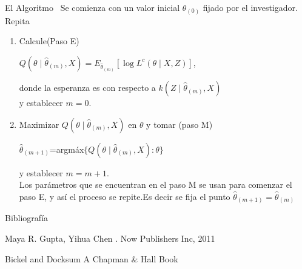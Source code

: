 \documentclass[utf8,spanish,xcolor={table,dvipsnames},12pt]{beamer}
\begin{document}
\begin{frame}{El Algoritmo}
\pause\
Se comienza con un valor inicial $\hat{\theta}_{(0)}$ fijado por el investigador.\\
Repita
\pause\
\begin{enumerate}
  \item Calcule(Paso E)
        \begin{center}
          $Q(\theta\mid\hat{\theta}_{(m)},X)=E_{\hat{\theta}_{(m)}}[\log L^{c}(\theta\mid X,Z)]$,
         \end{center}
        donde la esperanza es con respecto a $k(Z\mid\hat{\theta}_{(m)},X)$ \\
        y establecer $m=0$.
   \pause\ 
  \item Maximizar $Q(\theta\mid\hat{\theta}_{(m)},X)$ en $\theta$ y tomar (paso M)
        \begin{center}
          $\hat{\theta}_{(m+1)}$=argmáx$\{Q(\theta\mid\hat{\theta}_{(m)},X):\theta\}$
        \end{center}
         y establecer $ m=m+1$.\\
         Los parámetros que se encuentran en el paso M se usan para comenzar el paso E, y así el proceso se repite.Es decir se fija el punto $\hat{\theta}_{(m+1)}=\hat{\theta}_{(m)}$
\end{enumerate}
\end{frame}
\begin{frame}{Bibliografía}
\begin{thebibliography}{9}

Maya R. Gupta, Yihua Chen
.
\newblock Now Publishers Inc, 2011


Bickel and Docksum
\newblock A Chapman $\&$ Hall Book
\end{thebibliography}
\end{frame}
\end{document}
